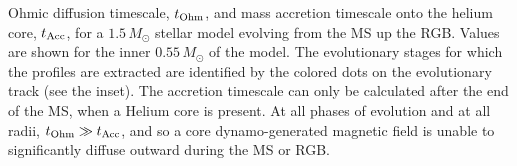 \label{fig:timescales}
Ohmic diffusion timescale, $t_{\rm Ohm}$, and mass accretion timescale onto the helium core, $t_{\rm Acc}$, for a $1.5 \, M_\odot$ stellar model evolving from the MS up the RGB. Values are shown for the inner $0.55 \, M_\odot$ of the model. The evolutionary stages for which the profiles are extracted are identified by the colored dots on the evolutionary track (see the inset). The accretion timescale can only be calculated after the end of the MS, when a Helium core is present. At all phases of evolution and at all radii, $t_{\rm Ohm} \gg t_{\rm Acc}$, and so a core dynamo-generated magnetic field is unable to significantly diffuse outward during the MS or RGB.
  